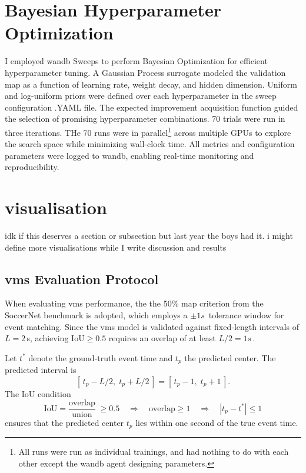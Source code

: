 \section{Bayesian Hyperparameter Optimization}
\label{sec:bayesian_optimization}

I employed \acrshort{wandb} Sweeps to perform Bayesian Optimization for efficient hyperparameter tuning.  A Gaussian Process surrogate modeled the validation \acrshort{map} as a function of learning rate, weight decay, and hidden dimension. Uniform and log-uniform priors were defined over each hyperparameter in the sweep configuration .YAML file. The expected improvement acquisition function guided the selection of promising hyperparameter combinations. 70 trials were run in three iterations. THe 70 runs were in parallel\footnote{All runs were run as individual trainings, and had nothing to do with each other except the \acrshort{wandb} agent designing parameters. } across multiple GPUs to explore the search space while minimizing wall-clock time. All metrics and configuration parameters were logged to \acrshort{wandb}, enabling real-time monitoring and reproducibility. 

\section{visualisation}

idk if this deserves a section or subsection but last year the boys had it. i might define more visualisations while I write discussion and results

\subsection{\acrshort{vms} Evaluation Protocol}
When evaluating \acrshort{vms} performance, the the 50\% \acrshort{map} criterion from the SoccerNet benchmark is adopted, which employs a $\pm 1s\,$ tolerance window for event matching. Since the \acrshort{vms} model is validated against fixed‐length intervals of $L = 2\,$s, achieving $\mathrm{IoU}\ge0.5$ requires an overlap of at least $L/2 = 1s\,$.

Let $t^*$ denote the ground‐truth event time and $t_p$ the predicted center. The predicted interval is
\[
    [\,t_p - L/2,\;t_p + L/2\,]
    = [\,t_p - 1,\;t_p + 1\,].
\] 
The IoU condition
\[
    \mathrm{IoU}
    = \frac{\text{overlap}}{\text{union}}
    \;\ge0.5
    \quad\Longrightarrow\quad
    \text{overlap}\ge1
    \quad\Longrightarrow\quad
    |t_p - t^*|\le1
\]
ensures that the predicted center $t_p$ lies within one second of the true event time.

